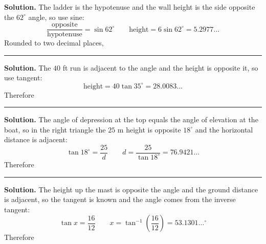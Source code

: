 \documentclass[12pt]{article}
\begin{document}




\noindent\textbf{Solution.} The ladder is the hypotenuse and the wall height is
the side opposite the $62^\circ$ angle, so use sine:
\[ \frac{\text{opposite}}{\text{hypotenuse}} = \sin 62^\circ
   \qquad \text{height} = 6 \sin 62^\circ = 5.2977\ldots \]
Rounded to two decimal places, 

\vspace{0.15cm}\noindent\rule{\linewidth}{0.2pt}


\noindent\textbf{Solution.} The $40$ ft run is adjacent to the angle and the
height is opposite it, so use tangent:
\[ \text{height} = 40 \tan 35^\circ = 28.0083\ldots \]
Therefore 

\vspace{0.15cm}\noindent\rule{\linewidth}{0.2pt}


\noindent\textbf{Solution.} The angle of depression at the top equals the angle
of elevation at the boat, so in the right triangle the $25$ m height is opposite
$18^\circ$ and the horizontal distance is adjacent:
\[ \tan 18^\circ = \frac{25}{d} \qquad d = \frac{25}{\tan 18^\circ} = 76.9421\ldots \]
Therefore 

\vspace{0.15cm}\noindent\rule{\linewidth}{0.2pt}


\noindent\textbf{Solution.} The height up the mast is opposite the angle and the
ground distance is adjacent, so the tangent is known and the angle comes from
the inverse tangent:
\[ \tan x = \frac{16}{12} \qquad x = \tan^{-1}\!\left(\frac{16}{12}\right) = 53.1301\ldots^\circ \]
Therefore 
\end{document}
